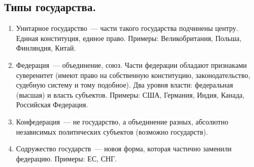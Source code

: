 \documentclass[12pt]{article}
\begin{document}
	\subsection{Типы государства.}
	\begin{enumerate}
		\item Унитарное государство~--- части такого государства подчинены центру. Единая конституция, единое право. Примеры: Великобритания, Польша, Финляндия, Китай.
		\item Федерация~--- объединение, союз. Части федерации обладают признаками суверенитет (имеют право на собственную конституцию, законодательство, судебную систему и тому подобное). Два уровня власти: федеральная (высшая) и власть субъектов. Примеры: США, Германия, Индия, Канада, Российская Федерация.
		\item Конфедерация~--- не государство, а объединение разных, абсолютно независимых политических субъектов (возможно государств).
		\item Содружество государств~--- новоя форма, которая частично заменили федерацию. Примеры: ЕС, СНГ.
	\end{enumerate}
\end{document}
